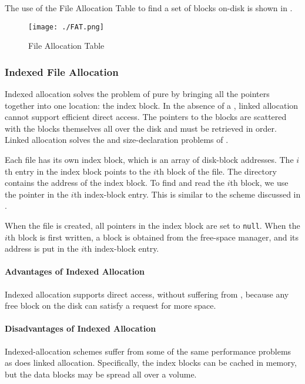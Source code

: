 The use of the File Allocation Table to find a set of blocks on-disk is shown in .
\begin{figure}[h!tbp]
  \centering
  \texttt{[image: ./FAT.png]}
  \caption{File Allocation Table}
  \label{fig:File_Allocation_Table}
\end{figure}

\subsubsection{Indexed File Allocation}\label{subsubsec:Indexed_File_Allocation}
Indexed allocation solves the problem of pure  by bringing all the pointers together into one location: the index block.
In the absence of a , linked allocation cannot support efficient direct access.
The pointers to the blocks are scattered with the blocks themselves all over the disk and must be retrieved in order.
Linked allocation solves the  and size-declaration problems of .

Each file has its own index block, which is an array of disk-block addresses.
The $i$th entry in the index block points to the $i$th block of the file.
The directory contains the address of the index block.
To find and read the $i$th block, we use the pointer in the $i$th index-block entry.
This is similar to the  scheme discussed in .

When the file is created, all pointers in the index block are set to \texttt{null}.
When the $i$th block is first written, a block is obtained from the free-space manager, and its address is put in the $i$th index-block entry.

\paragraph{Advantages of Indexed Allocation}\label{par:Indexed_File_Allocation_Advantages}
Indexed allocation supports direct access, without suffering from , because any free block on the disk can satisfy a request for more space.

\paragraph{Disadvantages of Indexed Allocation}\label{par:Indexed_File_Allocation_Disadvantages}
Indexed-allocation schemes suffer from some of the same performance problems as does linked allocation.
Specifically, the index blocks can be cached in memory, but the data blocks may be spread all over a volume.

